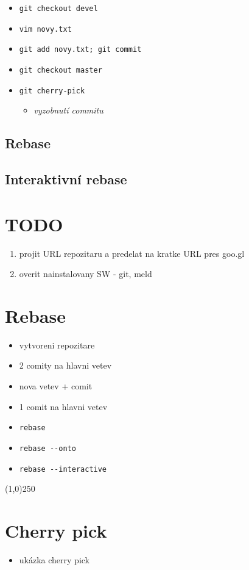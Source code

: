 \documentclass[10pt,twocolumn]{article}
\begin{document}
\begin{itemize}
  \item \texttt{git checkout devel}
  \item \texttt{vim novy.txt}
  \item \texttt{git add novy.txt; git commit}
  \item \texttt{git checkout master}
  \item \texttt{git cherry-pick}
  \begin{itemize} \item \textit{vyzobnutí commitu} \end{itemize}
\end{itemize}

\subsection{Rebase}

\subsection{Interaktivní rebase}


\section{TODO}

\begin{enumerate}
	\item projit URL repozitaru a predelat na kratke URL pres goo.gl
	\item overit nainstalovany SW - git, meld
\end{enumerate}

\section{Rebase}

\begin{itemize}
	\item vytvoreni repozitare
	\item 2 comity na hlavni vetev
	\item nova vetev + comit
	\item 1 comit na hlavni vetev
	\item \texttt{rebase}
	\item \texttt{rebase {-}{-}onto}
	\item \texttt{rebase {-}{-}interactive}
\end{itemize}

\begin{center}\line(1,0){250}\end{center}

\section{Cherry pick}

\begin{itemize}
	\item ukázka cherry pick
\end{itemize}
\end{document}
